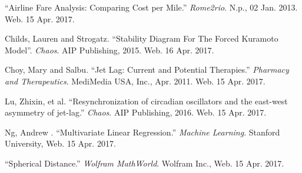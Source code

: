 \begin{thebibliography}{9}
``Airline Fare Analysis: Comparing Cost per Mile.'' \textit{Rome2rio}. N.p., 02 Jan. 2013. Web. 15 Apr. 2017.

Childs, Lauren and Strogatz. ``Stability Diagram For The Forced Kuramoto Model''. \textit{Chaos}. AIP Publishing, 2015. Web. 16 Apr. 2017.

Choy, Mary and Salbu. ``Jet Lag: Current and Potential Therapies.'' \textit{Pharmacy and Therapeutics}. MediMedia USA, Inc., Apr. 2011. Web. 15 Apr. 2017.

Lu, Zhixin, et al. ``Resynchronization of circadian oscillators and the east-west asymmetry of jet-lag.'' \textit{Chaos}. AIP Publishing, 2016. Web. 15 Apr. 2017.

Ng, Andrew . ``Multivariate Linear Regression.'' \textit{Machine Learning}. Stanford University, Web. 15 Apr. 2017.

``Spherical Distance.'' \textit{Wolfram MathWorld}. Wolfram Inc., Web. 15 Apr. 2017.
\end{thebibliography}
